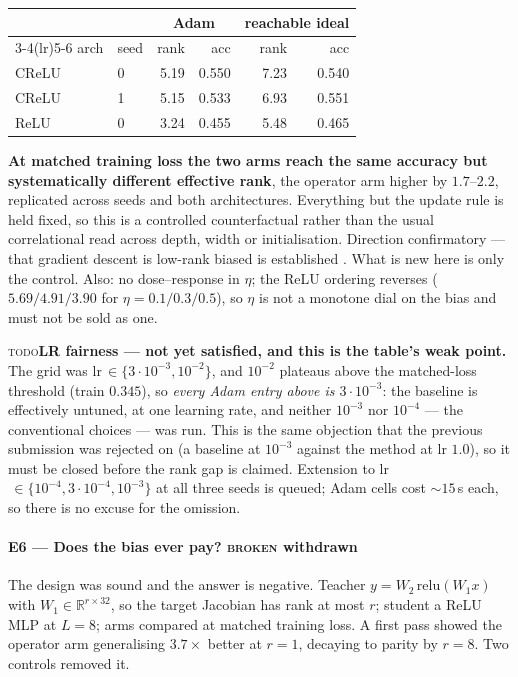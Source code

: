 \documentclass{article}
\newcommand{\TD}{{\color{orange!85!black}\textsc{todo}}}
\newcommand{\NO}{{\color{red!75!black}\textsc{broken}}}
\newcommand{\NOTE}[1]{{\color{gray}\small #1}}
\theoremstyle{plain}\newtheorem{theorem}{Theorem}\newtheorem{lemma}[theorem]{Lemma}
\theoremstyle{definition}\newtheorem{definition}[theorem]{Definition}
\newcommand{\R}{\mathbb{R}}\newcommand{\dW}{\Delta W}\newcommand{\Jop}{J}
\begin{document}
\begin{center}\small
\begin{tabular}{llrrrr}
\toprule
 & & \multicolumn{2}{c}{Adam} & \multicolumn{2}{c}{reachable ideal} \\
\cmidrule(lr){3-4}\cmidrule(lr){5-6}
arch & seed & rank & acc & rank & acc \\
\midrule
CReLU & 0 & 5.19 & 0.550 & 7.23 & 0.540 \\
CReLU & 1 & 5.15 & 0.533 & 6.93 & 0.551 \\
ReLU  & 0 & 3.24 & 0.455 & 5.48 & 0.465 \\
\bottomrule
\end{tabular}
\end{center}

\textbf{At matched training loss the two arms reach the same accuracy but systematically different
effective rank}, the operator arm higher by $1.7$--$2.2$, replicated across seeds and both
architectures. Everything but the update rule is held fixed, so this is a controlled counterfactual
rather than the usual correlational read across depth, width or initialisation.
\NOTE{Direction confirmatory --- that gradient descent is low-rank biased is established
\cite{arora2019implicit,gunasekar2017implicit}. What is new here is only the control. Also: no
dose--response in $\eta$; the ReLU ordering reverses ($5.69/4.91/3.90$ for
$\eta{=}0.1/0.3/0.5$), so $\eta$ is not a monotone dial on the bias and must not be sold as one.}

\NOTE{\TD{}\textbf{LR fairness --- not yet satisfied, and this is the table's weak point.} The grid
was lr$\,\in\{3\cdot10^{-3},10^{-2}\}$, and $10^{-2}$ plateaus above the matched-loss threshold
(train $0.345$), so \emph{every Adam entry above is $3\cdot10^{-3}$}: the baseline is effectively
untuned, at one learning rate, and neither $10^{-3}$ nor $10^{-4}$ --- the conventional choices ---
was run. This is the same objection that the previous submission was rejected on (a baseline at
$10^{-3}$ against the method at lr $1.0$), so it must be closed before the rank gap is claimed.
Extension to lr$\,\in\{10^{-4},3\cdot10^{-4},10^{-3}\}$ at all three seeds is queued; Adam cells
cost ${\sim}15$\,s each, so there is no excuse for the omission.}

\paragraph{E6 --- Does the bias ever pay? \NO{} withdrawn}
The design was sound and the answer is negative. Teacher $y=W_2\,\mathrm{relu}(W_1x)$ with
$W_1\in\R^{r\times32}$, so the target Jacobian has rank at most $r$; student a ReLU MLP at $L{=}8$;
arms compared at matched training loss. A first pass showed the operator arm generalising
$3.7\times$ better at $r{=}1$, decaying to parity by $r{=}8$. Two controls removed it.
\end{document}
